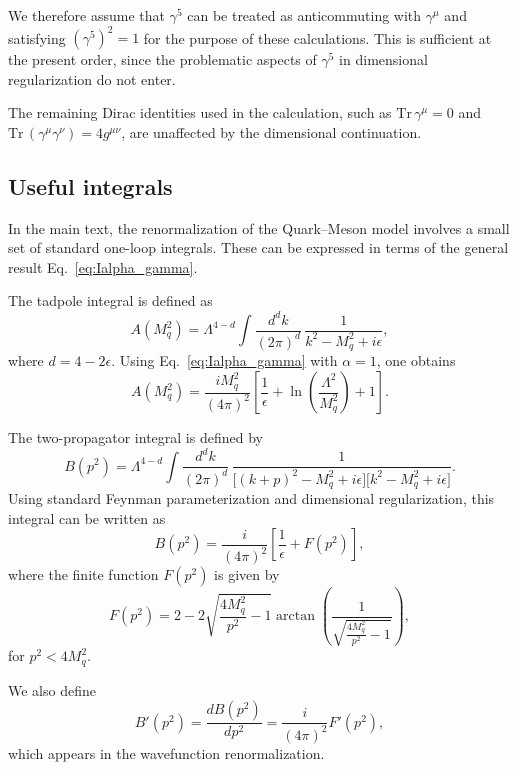 We therefore assume that $\gamma^5$ can be treated as anticommuting
with $\gamma^\mu$ and satisfying $(\gamma^5)^2=1$ for the purpose of
these calculations. This is sufficient at the present order, since
the problematic aspects of $\gamma^5$ in dimensional regularization
do not enter.

The remaining Dirac identities used in the calculation, such as
$\mathrm{Tr}\,\gamma^\mu = 0$ and
$\mathrm{Tr}\,(\gamma^\mu\gamma^\nu)=4g^{\mu\nu}$, are unaffected by
the dimensional continuation.

\subsection*{Useful integrals}
\label{app:loop_integrals}

In the main text, the renormalization of the Quark--Meson model
involves a small set of standard one-loop integrals.
These can be expressed in terms of the general result
Eq.~\eqref{eq:Ialpha_gamma}.

The tadpole integral is defined as
\begin{equation}
A(M_q^2)
=
\Lambda^{4-d}
\int \frac{d^d k}{(2\pi)^d}\,
\frac{1}{k^2 - M_q^2 + i\epsilon},
\end{equation}
where $d=4-2\epsilon$.
Using Eq.~\eqref{eq:Ialpha_gamma} with $\alpha=1$, one obtains
\begin{equation}
A(M_q^2)
=
\frac{i M_q^2}{(4\pi)^2}
\left[
\frac{1}{\epsilon}
+
\ln\!\left(\frac{\Lambda^2}{M_q^2}\right)
+ 1
\right].
\end{equation}

The two-propagator integral is defined by
\begin{equation}
B(p^2)
=
\Lambda^{4-d}
\int \frac{d^d k}{(2\pi)^d}\,
\frac{1}{\bigl[(k+p)^2 - M_q^2 + i\epsilon\bigr]
\bigl[k^2 - M_q^2 + i\epsilon\bigr]}.
\end{equation}
Using standard Feynman parameterization and dimensional
regularization, this integral can be written as
\begin{equation}
B(p^2)
=
\frac{i}{(4\pi)^2}
\left[
\frac{1}{\epsilon}
+
F(p^2)
\right],
\end{equation}
where the finite function $F(p^2)$ is given by
\begin{equation}
F(p^2)
=
2
-
2 \sqrt{\frac{4M_q^2}{p^2} - 1}
\arctan\!\left(
\frac{1}{\sqrt{\frac{4M_q^2}{p^2} - 1}}
\right),
\end{equation}
for $p^2 < 4M_q^2$.

We also define
\begin{equation}
B'(p^2)
=
\frac{dB(p^2)}{dp^2}
=
\frac{i}{(4\pi)^2} F'(p^2),
\end{equation}
which appears in the wavefunction renormalization.

